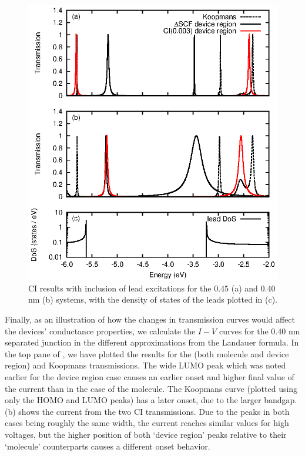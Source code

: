 \begin{figure}
	\begin{center}
		\includegraphics[width=0.9\linewidth]{figures/figure8a_8c}
	\end{center}
	\caption{CI results with inclusion of lead excitations for the
	         0.45 (a) and 0.40 nm (b) systems, with the density
		 of states of the leads plotted in (c).}
	\label{fig:cidevregion}
\end{figure}

Finally, as an illustration of how the changes in transmission curves would
affect the devices' conductance properties, we calculate the $I-V$ curves
for the 0.40 nm separated junction in the different approximations from
the Landauer formula. In the top
pane of , we have plotted the results for the \dscf (both
molecule and device region) and Koopmans transmissions. The wide LUMO
peak which was noted earlier for the device region case causes an earlier
onset and higher final value of the current than in the case of the
molecule. The Koopmans curve (plotted using only the HOMO and LUMO peaks)
has a later onset, due to the larger bandgap.
(b) shows the current from the two CI
transmissions. Due to the peaks in both cases being roughly the same
width, the current reaches similar values for high voltages, but the
higher position of both `device region' peaks relative to their `molecule'
counterparts causes a different onset behavior.

